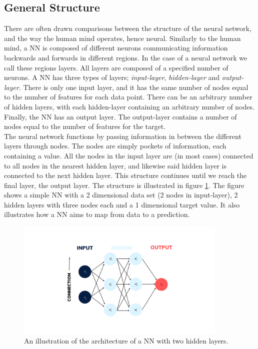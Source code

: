\subsection{General Structure}
There are often drawn comparisons between the structure of the neural network, 
and the way the human mind operates, hence neural. Similarly to the human mind, a \ac{NN} is 
composed of different neurons communicating information backwards and forwards in different 
regions. In the case of a neural network we call these regions layers. All layers
are composed of a specified number of neurons. A \ac{NN} has three types of layers;
\emph{input-layer}, \emph{hidden-layer} and \emph{output-layer}. There is only one input layer, and it has
the same number of nodes equal to the number of features for each data point. 
There can be an arbitrary number of hidden layers, with each hidden-layer containing
an arbitrary number of nodes. Finally, the \ac{NN} has an output layer. The output-layer
contains a number of nodes equal to the number of features for the target.
\\
The neural network functions by passing information in between the different layers through 
nodes. The nodes are simply pockets of information, each containing a value. 
All the nodes in the input layer are (in most cases) connected to all nodes in the nearest hidden layer,
and likewise said hidden layer is connected to the next hidden layer. This structure continues
until we reach the final layer, the output layer. The structure is illustrated in figure
\ref{fig:NN}. The figure shows a simple \ac{NN} with a 2 dimensional data set (2 nodes in input-layer),
2 hidden layers with three nodes each and a 1 dimensional target value. It also illustrates 
how a \ac{NN} aims to map from data to a prediction.
\begin{figure}
    \centering
    \vspace*{-12.5mm} 
    \includegraphics[width=0.9\textwidth]{Figures/Illustrations/Input_labels.png}
    \vspace*{-12.5mm} 
    \caption{An illustration of the architecture of a \ac{NN} with two hidden layers.}
    \label{fig:NN}
\end{figure}
